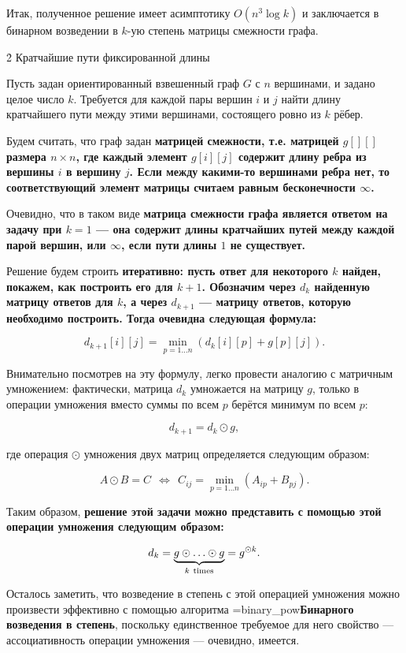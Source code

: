 Итак, полученное решение имеет асимптотику $O (n^3 \log k)$ и заключается в бинарном возведении в $k$-ую степень матрицы смежности графа.


\h2{ Кратчайшие пути фиксированной длины }

Пусть задан ориентированный взвешенный граф $G$ с $n$ вершинами, и задано целое число $k$. Требуется для каждой пары вершин $i$ и $j$ найти длину кратчайшего пути между этими вершинами, состоящего ровно из $k$ рёбер.

Будем считать, что граф задан \bf{матрицей смежности}, т.е. матрицей $g[][]$ размера $n \times n$, где каждый элемент $g[i][j]$ содержит длину ребра из вершины $i$ в вершину $j$. Если между какими-то вершинами ребра нет, то соответствующий элемент матрицы считаем равным бесконечности $\infty$.

Очевидно, что в таком виде \bf{матрица смежности} графа является \bf{ответом на задачу при $k=1$} --- она содержит длины кратчайших путей между каждой парой вершин, или $\infty$, если пути длины $1$ не существует.

Решение будем строить \bf{итеративно}: пусть ответ для некоторого $k$ найден, покажем, как построить его для $k+1$. Обозначим через $d_k$ найденную матрицу ответов для $k$, а через $d_{k+1}$ --- матрицу ответов, которую необходимо построить. Тогда очевидна следующая формула:

$$ d_{k+1}[i][j] = \min_{p = 1 \ldots n} ( d_k[i][p] + g[p][j] ). $$

Внимательно посмотрев на эту формулу, легко провести аналогию с матричным умножением: фактически, матрица $d_k$ умножается на матрицу $g$, только в операции умножения вместо суммы по всем $p$ берётся минимум по всем $p$:

$$ d_{k+1} = d_k \odot g, $$

где операция $\odot$ умножения двух матриц определяется следующим образом:

$$ A \odot B = C \ \ \Longleftrightarrow\ \  C_{ij} = \min_{p=1 \ldots n} (A_{ip} + B_{pj}). $$

Таким образом, \bf{решение} этой задачи можно представить с помощью этой операции умножения следующим образом:

$$ d_k = \underbrace{ g \odot \ldots \odot g}_{k\ {\rm times}} = g^{\odot k}. $$

Осталось заметить, что возведение в степень с этой операцией умножения можно произвести эффективно с помощью алгоритма \algohref=binary_pow{\bf{Бинарного возведения в степень}}, поскольку единственное требуемое для него свойство --- ассоциативность операции умножения --- очевидно, имеется.

